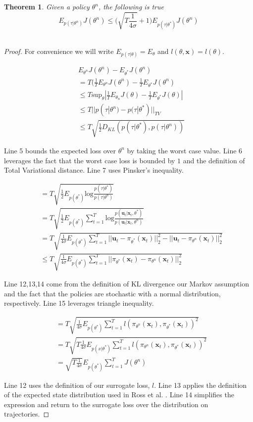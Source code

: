 \documentclass[10pt, conference]{ieeeconf}      %
\newtheorem{theorem}{Theorem}[section]
\newcommand{\bu}{\mathbf{u}}
\newcommand{\bx}{\mathbf{x}}
\begin{document}
\begin{theorem}
Given a policy $\theta^n$, the following is true 
$$E_{p(\tau|\theta^n)} J(\theta^n) \leq \big(\sqrt{T\frac{1}{4\sigma}}+1\big)E_{p(\tau|\theta^*)} J(\theta^n)$$\\
\end{theorem}
\begin{proof}
For convenience we will write $E_{p(\tau|\theta)} = E_{\theta}$ and $l(\theta,\bx) = l(\theta)$. 

\begin{align}
&E_{\theta^n} J(\theta^n) - E_{\theta^*} J(\theta^n) \\
&= T(\frac{1}{T}E_{\theta^n} J(\theta^n) -\frac{1}{T}E_{\theta^*} J(\theta^n)\\
&\leq  T\mbox{sup}_{\theta} |\frac{1}{T}E_{\theta_n}J(\theta) - \frac{1}{T}E_{\theta^*} J(\theta)|\\
&\leq  T| | p(\tau|\theta^n) - p(\tau|\theta^*)||_{TV}\\
&\leq T\sqrt{\frac{1}{2} D_{KL}(p(\tau|\theta^*),p(\tau|\theta^n))}
\end{align}

Line 5 bounds the expected loss over $\theta^n$ by taking the worst case value. Line 6 leverages the fact that the worst case loss is bounded by $1$ and the definition of Total Variational distance. Line 7 uses Pinsker's inequality. 


\begin{align}
&= T\sqrt{\frac{1}{2} E_{p(\theta^*)} \mbox{log} \frac{p(\tau|\theta^*)}{p(\tau|\theta^n)}}\\
&= T\sqrt{\frac{1}{2} E_{p(\theta^*)} \sum^T_{t=1}\mbox{log} \frac{p(\bu_t|\bx_t,\theta^*)}{p(\bu_t|\bx_t,\theta^n)}}\\
&= T\sqrt{\frac{1}{4\sigma} E_{p(\theta^*)} \sum^T_{t=1} ||\bu_t- \pi_{\theta^*}(\bx_t)||_2^2 - ||\bu_t- \pi_{\theta^n}(\bx_t)||_2^2}\\
&\leq T\sqrt{\frac{1}{4\sigma} E_{p(\theta^*)} \sum^T_{t=1}  ||\pi_{\theta^*}(\bx_t) - \pi_{\theta^n}(\bx_t)||_2^2}
\end{align}

Line 12,13,14 come from the definition of KL divergence our Markov assumption and the fact that the policies are stochastic with a normal distribution, respectively. Line 15 leverages triangle inequality. 

\begin{align}
&= T\sqrt{\frac{1}{4\sigma} E_{p(\theta^*)} \sum^T_{t=1}  l(\pi_{\theta^n}(\bx_t),\pi_{\theta^*}(\bx_t))^2}\\
&= T\sqrt{T\frac{1}{4\sigma}E_{p(x|\theta^*)} \sum^T_{t=1}  l(\pi_{\theta^n}(\bx_t),\pi_{\theta^*}(\bx_t))^2}\\
&=\sqrt{T\frac{1}{4\sigma}}E_{p(\theta^*)} \sum^T_{t=1}  J(\theta^n)
\end{align}

Line 12 uses the definition of our surrogate loss, $l$. Line 13 applies the definition of the expected state distribution used in Ross et al. \cite{ross2010reduction}. Line 14 simplifies the expression and return to the surrogate loss over the distribution on trajectories. 

\end{proof}
 
\end{document}
